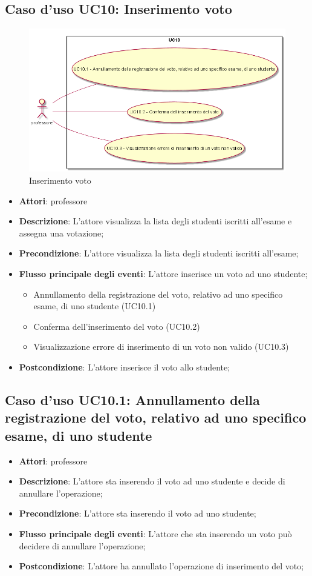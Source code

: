 \subsection{Caso d'uso \texorpdfstring{UC10}{UC10}: Inserimento voto }
\begin{figure} [H]
\centering
\includegraphics[scale=0.45]{./img/UC10.png}
\caption{Inserimento voto }\label{}
\end{figure}
\begin{itemize}
\item \textbf{Attori}: professore
\item \textbf{Descrizione}: L'attore visualizza la lista degli studenti iscritti all'esame e assegna una votazione;
\item \textbf{Precondizione}: L'attore visualizza la lista degli studenti iscritti all'esame;
\item \textbf{Flusso principale degli eventi}: L'attore inserisce un voto ad uno studente;
\begin{itemize}
\item Annullamento della registrazione del voto, relativo ad uno specifico esame, di uno studente (UC10.1)
\item Conferma dell'inserimento del voto (UC10.2)
\item Visualizzazione errore di inserimento di un voto non valido (UC10.3)
\end{itemize}
\item \textbf{Postcondizione}: L'attore inserisce il voto allo studente;
\end{itemize}
\subsection{Caso d'uso \texorpdfstring{UC10.1}{UC10.1}: Annullamento della registrazione del voto, relativo ad uno specifico esame, di uno studente}
\begin{itemize}
\item \textbf{Attori}: professore
\item \textbf{Descrizione}: L'attore sta inserendo il voto ad uno studente e decide di annullare l'operazione;
\item \textbf{Precondizione}: L'attore sta inserendo il voto ad uno studente;
\item \textbf{Flusso principale degli eventi}: L'attore che sta inserendo un voto può decidere di annullare l'operazione;
\item \textbf{Postcondizione}: L'attore ha annullato l'operazione di inserimento del voto;
\end{itemize}
